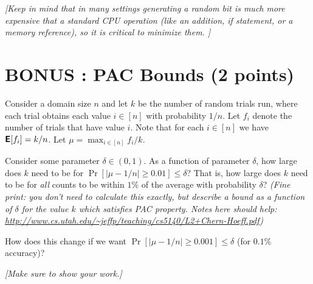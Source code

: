 \documentclass[11pt]{article}
\begin{document}
\emph{[Keep in mind that in many settings generating a random bit is much more expensive that a standard CPU operation (like an addition, if statement, or a memory reference), so it is critical to minimize them.  ]}


\vspace{-.1in}
\section{BONUS : PAC Bounds (2 points)}

Consider a domain size $n$ and let $k$ be the number of random trials run, where each trial obtains each value $i \in [n]$ with probability $1/n$.  
Let $f_i$ denote the number of trials that have value $i$.  
Note that for each $i \in [n]$ we have $\textbf{\textsf{E}}[f_i] = k/n$.  
Let $\mu = \max_{i \in [n]} f_i/k$.  

Consider some parameter $\delta \in (0,1)$.  
As a function of parameter $\delta$, how large does $k$ need to be for 
$\Pr[ |\mu - 1/n| \geq 0.01] \leq \delta$?
That is, how large does $k$ need to be for \emph{all} counts to be within $1\%$ of the average with probability $\delta$? 
\emph{(Fine print:  you don't need to calculate this exactly, but describe a bound as a function of $\delta$ for the value $k$ which satisfies PAC property.  Notes here should help: \url{http://www.cs.utah.edu/~jeffp/teaching/cs5140/L2+Chern-Hoeff.pdf})}

How does this change if we want
$\Pr[ |\mu - 1/n| \geq 0.001] \leq \delta$ (for $0.1\%$ accuracy)?

\emph{[Make sure to show your work.]}
\end{document}

